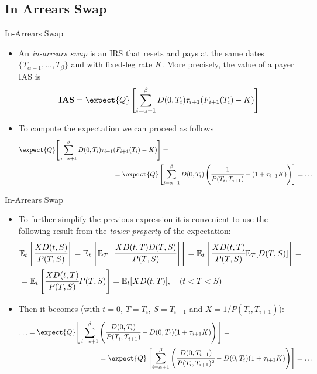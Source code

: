 \documentclass{beamer}
\begin{document}
\subsection{In Arrears Swap}
\begin{frame}{In-Arrears Swap}
	\begin{itemize}
		\item<1-> An \emph{in-arrears swap} is an IRS that resets and pays at the same dates $\{T_{\alpha+1},\ldots, T_\beta\}$ and with fixed-leg rate $K$. More precisely, the value of a payer IAS is
		\begin{equation}
			\textbf{IAS}=\expect{Q}\left[\sum_{i=\alpha+1}^{\beta}D(0,T_i)\tau_{i+1}(F_{i+1}(T_i)-K)\right]
		\end{equation}
		\item<2-> To compute the expectation we can proceed as follows
		\begin{equation*}
			\begin{aligned}
				\expect{Q}\Bigg[\sum_{i=\alpha+1}^{\beta}D(0,T_i)\tau_{i+1}&(F_{i+1}(T_i)-K)\Bigg] = \\
				&=\expect{Q}\left[\sum_{i=\alpha+1}^{\beta}D(0,T_i)\left(\cfrac{1}{P(T_i,T_{i+1})}-(1+\tau_{i+1}K)\right)\right]=\ldots
			\end{aligned}
		\end{equation*}
	\end{itemize}
\end{frame}

\begin{frame}{In-Arrears Swap}
	\begin{itemize}
		\item<1-> To further simplify the previous expression it is convenient to use the following result from the \emph{tower property} of the expectation:
		\begin{equation*}
			\begin{aligned}
				&\mathbb{E}_t\left[\cfrac{XD(t,S)}{P(T,S)} \right]=\mathbb{E}_t\left[\mathbb{E}_T\left[\cfrac{XD(t,T)D(T,S)}{P(T,S)} \right]\right]=\mathbb{E}_t\left[\cfrac{XD(t,T)}{P(T,S)}\mathbb{E}_T[D(T,S)]\right]= \\
				& =\mathbb{E}_t\left[\cfrac{XD(t,T)}{P(T,S)}P(T,S)\right]=\mathbb{E}_t[XD(t,T)],\quad (t<T<S)
			\end{aligned}
		\end{equation*}
		\item<2-> Then it becomes (with $t=0$, $T=T_i$, $S=T_{i+1}$ and $X=1/P(T_i,T_{i+1})$):
		\begin{equation*}
			\begin{aligned}
				\ldots=\expect{Q}\Bigg[\sum_{i=\alpha+1}^{\beta}&\left(\cfrac{D(0,T_i)}{P(T_i,T_{i+1})}-D(0,T_i)(1+\tau_{i+1}K)\right)\Bigg] = \\
				&=\expect{Q}\left[\sum_{i=\alpha+1}^{\beta}\left(\cfrac{D(0,T_{i+1})}{P(T_i,T_{i+1})^2}-D(0,T_i)(1+\tau_{i+1}K)\right)\right] = \ldots
			\end{aligned}
		\end{equation*}
	\end{itemize}
\end{frame}
\end{document}
